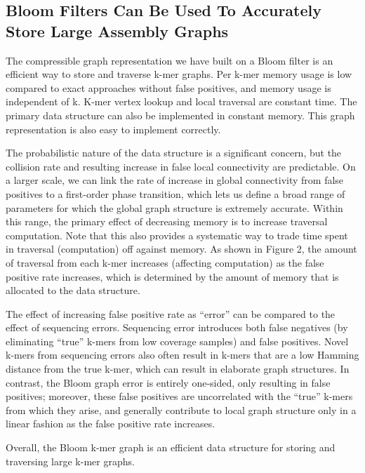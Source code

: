 \documentclass[12pt]{article} \usepackage{simplemargins}
\begin{document}
\subsection{Bloom Filters Can Be Used To Accurately Store Large Assembly Graphs}
The compressible graph representation we have built on a Bloom filter
is an efficient way to store and traverse k-mer graphs.  Per k-mer
memory usage is low compared to exact approaches without false positives,
and memory usage is independent of k.  K-mer vertex lookup and
local traversal are constant time.  The primary data structure can
also be implemented in constant memory.  This graph representation is
also easy to implement correctly.

The probabilistic nature of the data structure is a significant
concern, but the collision rate and resulting increase in false local
connectivity are predictable.  On a larger scale, we can link the
rate of increase in global connectivity from false positives to a
first-order phase transition, which lets us define a broad range of
parameters for which the global graph structure is extremely accurate.
Within this range, the primary effect of decreasing memory is to increase
traversal computation.  Note that this also provides a systematic way
to trade time spent in traversal (computation) off against memory. As shown 
in Figure 2, the amount of traversal from each k-mer increases 
(affecting computation) as the false positive rate increases, which 
is determined by the amount of memory that is allocated to the data 
structure.

The effect of increasing false positive rate as ``error'' can be
compared to the effect of sequencing errors.  Sequencing error
introduces both false negatives (by eliminating ``true'' k-mers from
low coverage samples) and false positives.  Novel k-mers
from sequencing errors also often result in k-mers that are
a low Hamming distance from the true k-mer, which can result in
elaborate graph structures.  In contrast, the Bloom graph error is
entirely one-sided, only resulting in false positives; moreover, these
false positives are uncorrelated with the ``true'' k-mers from which
they arise, and generally contribute to local graph structure only 
in a linear fashion as the false positive rate increases.

Overall, the Bloom k-mer graph is an efficient data structure for
storing and traversing large k-mer graphs.
\end{document}
